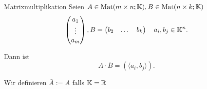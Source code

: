 \documentclass[class=article, crop=false]{standalone}
\begin{document}
\begin{zettel}{Matrixmultiplikation}
    Seien $A \in \operatorname{Mat}(m \times n; \mathbb{K}), B \in  \operatorname{Mat}( n \times  k; \mathbb{K}) $ 
\[
 \begin{pmatrix}
 a_1 \\
 \vdots \\
 a_m \\
 \end{pmatrix},
 B = \begin{pmatrix}
 b_2 & \dots &  b_k \\
 \end{pmatrix}
 \quad a_i,b_j \in   \mathbb{K}^n
.\]

Dann ist
\[
A \cdot  \bar{B} = \left(\langle a_i,b_j\rangle \right)
.\]

Wir definieren $\bar{A} := A$ falls $\mathbb{K}  = \mathbb{R} $ 
\end{zettel}
\end{document}
